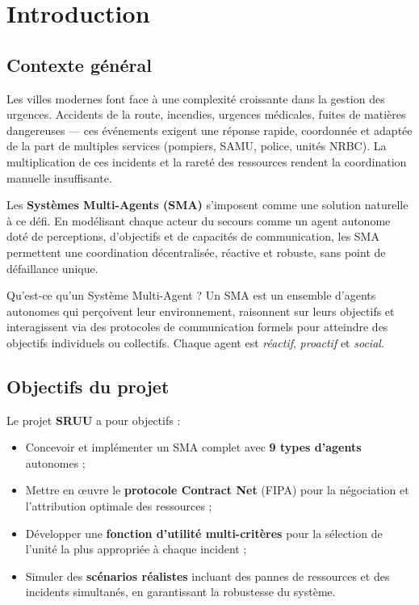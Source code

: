\documentclass[12pt, a4paper]{report}
\begin{document}
\listoffigures
\clearpage

\chapter{Introduction}

\section{Contexte général}

Les villes modernes font face à une complexité croissante dans la gestion des urgences.
Accidents de la route, incendies, urgences médicales, fuites de matières dangereuses —
ces événements exigent une réponse rapide, coordonnée et adaptée de la part de multiples
services (pompiers, SAMU, police, unités NRBC). La multiplication de ces incidents
et la rareté des ressources rendent la coordination manuelle insuffisante.

Les \textbf{Systèmes Multi-Agents (SMA)} s'imposent comme une solution naturelle à ce défi.
En modélisant chaque acteur du secours comme un agent autonome doté de perceptions,
d'objectifs et de capacités de communication, les SMA permettent une coordination
décentralisée, réactive et robuste, sans point de défaillance unique.

\begin{infobox}{Qu'est-ce qu'un Système Multi-Agent ?}
Un SMA est un ensemble d'agents autonomes qui perçoivent leur environnement, raisonnent
sur leurs objectifs et interagissent via des protocoles de communication formels pour
atteindre des objectifs individuels ou collectifs. Chaque agent est \emph{réactif},
\emph{proactif} et \emph{social}.
\end{infobox}

\section{Objectifs du projet}

Le projet \textbf{SRUU} a pour objectifs :

\begin{itemize}[leftmargin=*, itemsep=5pt]
  \item[\color{CyanNeon}$\blacktriangleright$]
    Concevoir et implémenter un SMA complet avec \textbf{9 types d'agents} autonomes ;
  \item[\color{OrangeNeon}$\blacktriangleright$]
    Mettre en \oe{}uvre le \textbf{protocole Contract Net} (FIPA) pour la négociation
    et l'attribution optimale des ressources ;
  \item[\color{GreenNeon}$\blacktriangleright$]
    Développer une \textbf{fonction d'utilité multi-critères} pour la sélection de l'unité
    la plus appropriée à chaque incident ;
  \item[\color{PurpleNeon}$\blacktriangleright$]
    Simuler des \textbf{scénarios réalistes} incluant des pannes de ressources et des
    incidents simultanés, en garantissant la robustesse du système.
\end{itemize}
\end{document}
